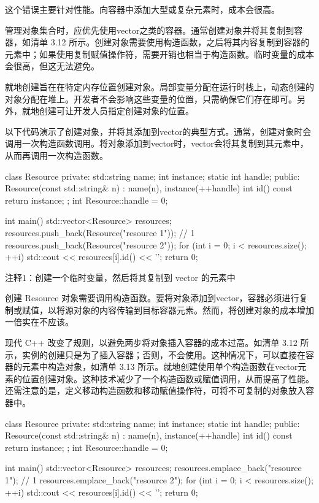 这个错误主要针对性能。向容器中添加大型或复杂元素时，成本会很高。


管理对象集合时，应优先使用vector之类的容器。通常创建对象并将其复制到容器，如清单 3.12 所示。创建对象需要使用构造函数，之后将其内容复制到容器的元素中；如果使用复制赋值操作符，需要开销也相当于构造函数。临时变量的成本会很高，但这无法避免。

就地创建旨在在特定内存位置创建对象。局部变量分配在运行时栈上，动态创建的对象分配在堆上。开发者不会影响这些变量的位置，只需确保它们存在即可。另外，就地创建可让开发人员指定创建对象的位置。

以下代码演示了创建对象，并将其添加到vector的典型方式。通常，创建对象时会调用一次构造函数调用。将对象添加到vector时，vector会将其复制到其元素中，从而再调用一次构造函数。


\begin{cpp}
class Resource {
private:
  std::string name;
  int instance;
  static int handle;
public:
  Resource(const std::string& n) : name(n), instance(++handle) {}
  int id() const { return instance; }
};
int Resource::handle = 0;

int main() {
  std::vector<Resource> resources;
  resources.push_back(Resource("resource 1")); // 1
  resources.push_back(Resource("resource 2"));
  for (int i = 0; i < resources.size(); ++i)
    std::cout << resources[i].id() << '\n';
  return 0;
}
\end{cpp}

{\footnotesize
注释1：创建一个临时变量，然后将其复制到 vector 的元素中
}


创建 Resource 对象需要调用构造函数。要将对象添加到vector，容器必须进行复制或赋值，以将源对象的内容传输到目标容器元素。然而，将创建对象的成本增加一倍实在不应该。


现代 C++ 改变了规则，以避免两步将对象插入容器的成本过高。如清单 3.12 所示，实例的创建只是为了插入容器；否则，不会使用。这种情况下，可以直接在容器的元素中构造对象，如清单 3.13 所示。就地创建使用单个构造函数在vector元素的位置创建对象。这种技术减少了一个构造函数或赋值调用，从而提高了性能。还需注意的是，定义移动构造函数和移动赋值操作符，可将不可复制的对象放入容器中。


\begin{cpp}
class Resource {
private:
  std::string name;
  int instance;
  static int handle;
public:
  Resource(const std::string& n) : name(n), instance(++handle) {}
  int id() const { return instance; }
};
int Resource::handle = 0;

int main() {
  std::vector<Resource> resources;
  resources.emplace_back("resource 1"); // 1
  resources.emplace_back("resource 2");
  for (int i = 0; i < resources.size(); ++i)
    std::cout << resources[i].id() << '\n';
  return 0;
}
\end{cpp}

